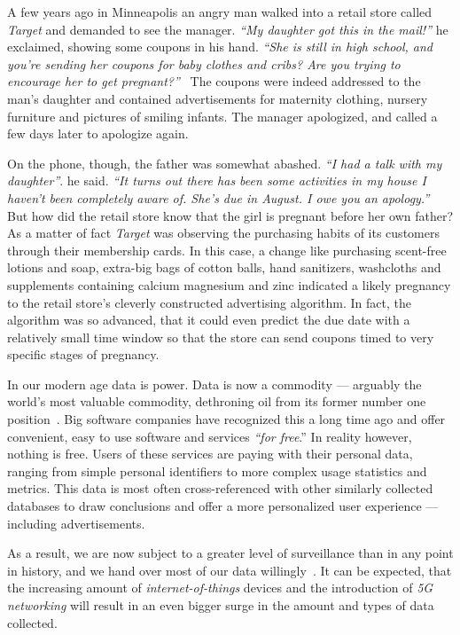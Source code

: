 A few years ago in Minneapolis an angry man walked into a retail store called \textit{Target} and demanded to see the manager. \textit{``My daughter got this in the mail!''} he exclaimed, showing some coupons in his hand. \textit{``She is still in high school, and you're sending her coupons for baby clothes and cribs?
Are you trying to encourage her to get pregnant?''}~\cite{youtube01,nytimes01} The coupons were indeed addressed to the man's daughter and contained advertisements for maternity clothing, nursery furniture and pictures of smiling infants.
The manager apologized, and called a few days later to apologize again.

On the phone, though, the father was somewhat abashed. \textit{``I had a talk with my daughter''}.
he said. \textit{``It turns out there has been some activities in my house I haven't been completely aware of.
She's due in August.
I owe you an apology.''}~\cite{nytimes01} But how did the retail store know that the girl is pregnant before her own father?
As a matter of fact \textit{Target} was observing the purchasing habits of its customers through their membership cards.
In this case, a change like purchasing scent-free lotions and soap, extra-big bags of cotton balls, hand sanitizers, washcloths and supplements containing calcium magnesium and zinc indicated a likely pregnancy to the retail store's cleverly constructed advertising algorithm.
In fact, the algorithm was so advanced, that it could even predict the due date with a relatively small time window so that the store can send coupons timed to very specific stages of pregnancy.

In our modern age data is power.
Data is now a commodity --- arguably the world's most valuable commodity, dethroning oil from its former number one position~\cite{economist01}.
Big software companies have recognized this a long time ago and offer convenient, easy to use software and services \textit{``for free}.'' In reality however, nothing is free.
Users of these services are paying with their personal data, ranging from simple personal identifiers to more complex usage statistics and metrics.
This data is most often cross-referenced with other similarly collected databases to draw conclusions and offer a more personalized user experience --- including advertisements.

As a result, we are now subject to a greater level of surveillance than in any point in history, and we hand over most of our data willingly~\cite{factortech01}.
It can be expected, that the increasing amount of \textit{internet-of-things} devices and the introduction of \textit{5G networking} will result in an even bigger surge in the amount and types of data collected.